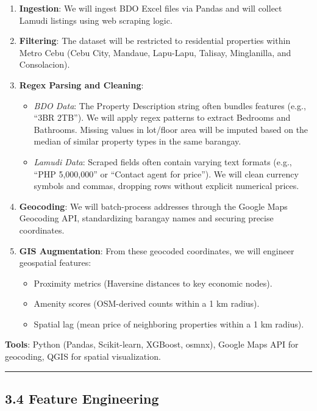 \begin{enumerate}
\item \textbf{Ingestion}: We will ingest BDO Excel files via Pandas and will collect Lamudi listings using web scraping logic.
\item \textbf{Filtering}: The dataset will be restricted to residential properties within Metro Cebu (Cebu City, Mandaue, Lapu-Lapu, Talisay, Minglanilla, and Consolacion).
\item \textbf{Regex Parsing and Cleaning}:
\begin{itemize}
\item \emph{BDO Data}: The Property Description string often bundles features (e.g., ``3BR 2TB''). We will apply regex patterns to extract Bedrooms and Bathrooms. Missing values in lot/floor area will be imputed based on the median of similar property types in the same barangay.
\item \emph{Lamudi Data}: Scraped fields often contain varying text formats (e.g., ``PHP 5,000,000'' or ``Contact agent for price''). We will clean currency symbols and commas, dropping rows without explicit numerical prices.
\end{itemize}
\item \textbf{Geocoding}: We will batch-process addresses through the Google Maps Geocoding API, standardizing barangay names and securing precise coordinates.
\item \textbf{GIS Augmentation}: From these geocoded coordinates, we will engineer geospatial features:
\begin{itemize}
\item Proximity metrics (Haversine distances to key economic nodes).
\item Amenity scores (OSM-derived counts within a 1 km radius).
\item Spatial lag (mean price of neighboring properties within a 1 km radius).
\end{itemize}
\end{enumerate}

\textbf{Tools}: Python (Pandas, Scikit-learn, XGBoost, osmnx), Google Maps API for geocoding, QGIS for spatial visualization.

\begin{center}\rule{0.5\linewidth}{0.5pt}\end{center}

\subsection{\texorpdfstring{\textbf{3.4 Feature Engineering}}{3.4 Feature Engineering}}\label{feature-engineering}

